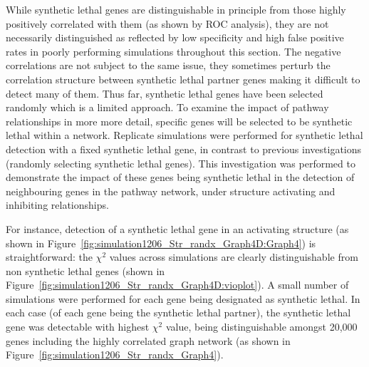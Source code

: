 While \gls{synthetic lethal} genes are distinguishable in principle from those highly positively correlated with them (as shown by \gls{ROC} analysis), they are not necessarily distinguished as reflected by low specificity and high false positive rates in poorly performing simulations throughout this section. The negative correlations are not subject to the same issue, they sometimes perturb the correlation structure between \gls{synthetic lethal} partner genes making it difficult to detect many of them. Thus far, \gls{synthetic lethal} genes have been selected randomly which is a limited approach. To examine the impact of pathway relationships in more more detail, specific genes will be selected to be \gls{synthetic lethal} within a network. Replicate simulations were performed for \gls{synthetic lethal} detection with a fixed \gls{synthetic lethal} gene, in contrast to previous investigations (randomly selecting \gls{synthetic lethal} genes). This investigation was performed to demonstrate the impact of these genes being \gls{synthetic lethal} in the detection of neighbouring genes in the pathway network, under  structure activating and inhibiting relationships.

For instance, detection of a \gls{synthetic lethal} gene in an activating  structure (as shown in Figure~\ref{fig:simulation1206_Str_randx_Graph4D:Graph4}) is straightforward: the $\chi^2$ values across simulations are clearly distinguishable from non synthetic lethal genes (shown in Figure~\ref{fig:simulation1206_Str_randx_Graph4D:vioplot}). A small number of simulations were performed for each gene being designated as \gls{synthetic lethal}. In each case (of each gene being the \gls{synthetic lethal} partner), the \gls{synthetic lethal} gene was detectable with highest $\chi^2$ value, being distinguishable amongst 20,000 genes including the highly correlated graph network (as shown in Figure~\ref{fig:simulation1206_Str_randx_Graph4}).

